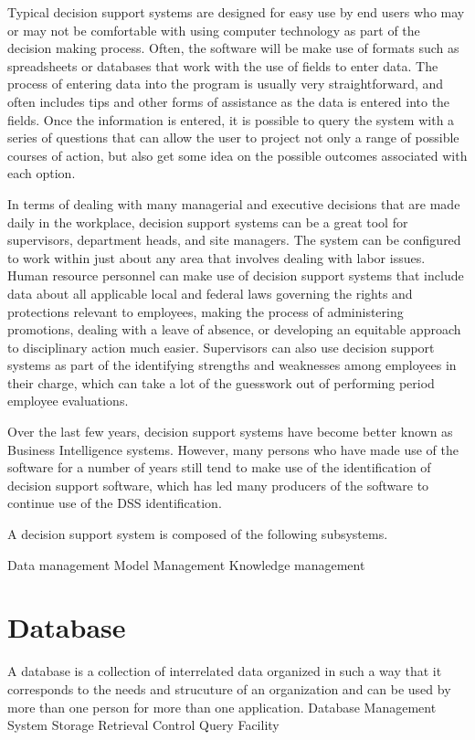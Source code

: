 Typical decision support systems are designed for easy use by end users who may or may not be comfortable with using computer technology as part of the decision making process. Often, the software will be make use of formats such as spreadsheets or databases that work with the use of fields to enter data. The process of entering data into the program is usually very straightforward, and often includes tips and other forms of assistance as the data is entered into the fields. Once the information is entered, it is possible to query the system with a series of questions that can allow the user to project not only a range of possible courses of action, but also get some idea on the possible outcomes associated with each option.

In terms of dealing with many managerial and executive decisions that are made daily in the workplace, decision support systems can be a great tool for supervisors, department heads, and site managers. The system can be configured to work within just about any area that involves dealing with labor issues. Human resource personnel can make use of decision support systems that include data about all applicable local and federal laws governing the rights and protections relevant to employees, making the process of administering promotions, dealing with a leave of absence, or developing an equitable approach to disciplinary action much easier. Supervisors can also use decision support systems as part of the identifying strengths and weaknesses among employees in their charge, which can take a lot of the guesswork out of performing period employee evaluations.

Over the last few years, decision support systems have become better known as Business Intelligence systems. However, many persons who have made use of the software for a number of years still tend to make use of the identification of decision support software, which has led many producers of the software to continue use of the DSS identification.

A decision support system is composed of the following subsystems.

Data management
Model Management
Knowledge management

\section{Database}
A database is a collection of interrelated data organized in such a way that it corresponds to the needs and strucuture of an organization and can be used by more than one person for more than one application.
Database Management System
Storage
Retrieval 
Control
Query Facility
